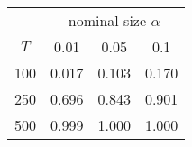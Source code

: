 % 
\begin{tabular}{cccc}
  \hline
  & \multicolumn{3}{c}{nominal size $\alpha$} \\
 $T$ & 0.01 & 0.05 & 0.1 \\
 \hline
100 & 0.017 & 0.103 & 0.170 \\ 
  250 & 0.696 & 0.843 & 0.901 \\ 
  500 & 0.999 & 1.000 & 1.000 \\ 
   \hline
\end{tabular}
